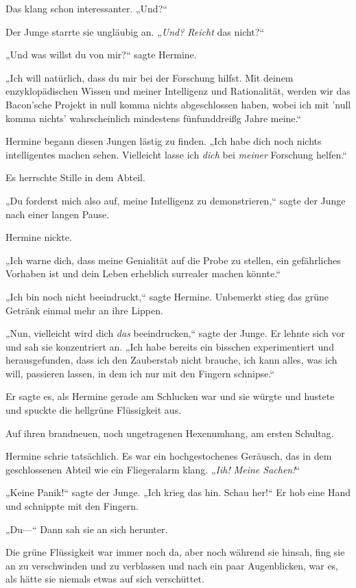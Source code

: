 {Das klang schon interessanter. „Und?“

Der Junge starrte sie ungläubig an. „\emph{Und? Reicht} das nicht?“

„Und was willst du von mir?“ sagte Hermine.

„Ich will natürlich, dass du mir bei der Forschung hilfst. Mit deinem enzyklopädischen Wissen und meiner Intelligenz und Rationalität, werden wir das Bacon'sche Projekt in null komma nichts abgeschlossen haben, wobei ich mit 'null komma nichts' wahrscheinlich mindestens fünfunddreißg Jahre meine.“

Hermine begann diesen Jungen lästig zu finden. „Ich habe dich noch nichts intelligentes machen sehen. Vielleicht lasse ich \emph{dich} bei \emph{meiner} Forschung helfen.“

Es herrschte Stille in dem Abteil.

„Du forderst mich also auf, meine Intelligenz zu demonstrieren,“ sagte der Junge nach einer langen Pause.

Hermine nickte.

„Ich warne dich, dass meine Genialität auf die Probe zu stellen, ein gefährliches Vorhaben ist und dein Leben erheblich surrealer machen könnte.“

„Ich bin noch nicht beeindruckt,“ sagte Hermine. Unbemerkt stieg das grüne Getränk einmal mehr an ihre Lippen.

„Nun, vielleicht wird dich \emph{das} beeindrucken,“ sagte der Junge. Er lehnte sich vor und sah sie konzentriert an. „Ich habe bereits ein bisschen experimentiert und herausgefunden, dass ich den Zauberstab nicht brauche, ich kann alles, was ich will, passieren lassen, in dem ich nur mit den Fingern schnipse.“

Er sagte es, als Hermine gerade am Schlucken war und sie würgte und hustete und spuckte die hellgrüne Flüssigkeit aus.

Auf ihren brandneuen, noch ungetragenen Hexenumhang, am ersten Schultag.

Hermine schrie tatsächlich. Es war ein hochgestochenes Geräusch, das in dem geschlossenen Abteil wie ein Fliegeralarm klang. „\emph{Iih! Meine Sachen!}“

„Keine Panik!“ sagte der Junge. „Ich krieg das hin. Schau her!“ Er hob eine Hand und schnippte mit den Fingern.

„Du—“ Dann sah sie an sich herunter.

Die grüne Flüssigkeit war immer noch da, aber noch während sie hinsah, fing sie an zu verschwinden und zu verblassen und nach ein paar Augenblicken, war es, als hätte sie niemals etwas auf sich verschüttet.

}
